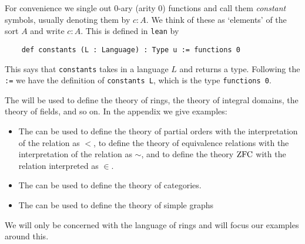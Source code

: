 \begin{dfn}[Language]
  For convenience we single out $0$-ary (arity $0$) functions and
  call them \textit{constant} symbols, usually denoting them by $c : A$.
  We think of these as `elements' of the sort $A$ and write $c : A$.
  This is defined in \texttt{lean} by

  \begin{lstlisting}
    def constants (L : Language) : Type u := functions 0\end{lstlisting}

  This says that \texttt{constants} takes in a language $L$ and returns a type.
  Following the \texttt{:=} we have the definition of \texttt{constants L},
  which is the type \texttt{functions 0}.
\end{dfn}

\begin{eg}
  The 
  will be used to define the theory of rings,
  the theory of integral domains, the theory of fields, and so on.
  In the appendix we give examples:
  \begin{itemize}
    \item The  %
          can be used to define the theory of partial orders
          with the interpretation of the relation as $<$,
          to define the theory of equivalence relations with the
          interpretation of the relation as $\sim$,
          and to define the theory $\operatorname{ZFC}$ with the relation interpreted as $\in$.
    \item The  %
          can be used to define the theory of categories.
    \item The 
          can be used to define the theory of simple graphs
  \end{itemize}
  We will only be concerned with the language of rings and will
  focus our examples around this.
\end{eg}

